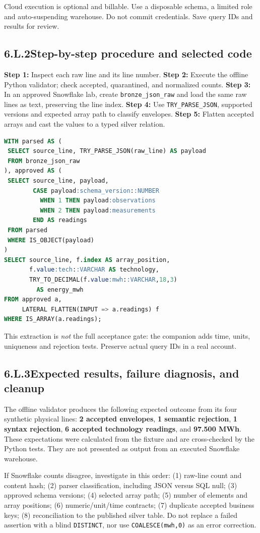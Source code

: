 \documentclass[11pt,twoside]{article}
\newcommand{\topic}[2]{\subsection*{#1\quad #2}}
\begin{document}
Cloud execution is optional and billable. Use a disposable schema, a limited role and auto-suspending warehouse. Do not commit credentials. Save query IDs and results for review.

\topic{6.L.2}{Step-by-step procedure and selected code}
\textbf{Step 1:} Inspect each raw line and its line number. \textbf{Step 2:} Execute the offline Python validator; check accepted, quarantined, and normalized counts. \textbf{Step 3:} In an approved Snowflake lab, create \texttt{bronze\_json\_raw} and load the same raw lines as text, preserving the line index. \textbf{Step 4:} Use \texttt{TRY\_PARSE\_JSON}, supported versions and expected array path to classify envelopes. \textbf{Step 5:} Flatten accepted arrays and cast the values to a typed silver relation.

\begin{lstlisting}[language=SQL,caption={The core extraction; full script and guards in companion lab.}]
WITH parsed AS (
 SELECT source_line, TRY_PARSE_JSON(raw_line) AS payload
 FROM bronze_json_raw
), approved AS (
 SELECT source_line, payload,
        CASE payload:schema_version::NUMBER
          WHEN 1 THEN payload:observations
          WHEN 2 THEN payload:measurements
        END AS readings
 FROM parsed
 WHERE IS_OBJECT(payload)
)
SELECT source_line, f.index AS array_position,
       f.value:tech::VARCHAR AS technology,
       TRY_TO_DECIMAL(f.value:mwh::VARCHAR,18,3)
         AS energy_mwh
FROM approved a,
     LATERAL FLATTEN(INPUT => a.readings) f
WHERE IS_ARRAY(a.readings);
\end{lstlisting}
This extraction is \emph{not} the full acceptance gate: the companion adds time, units, uniqueness and rejection tests. Preserve actual query IDs in a real account.
\newpage
\topic{6.L.3}{Expected results, failure diagnosis, and cleanup}
The offline validator produces the following expected outcome from its four synthetic physical lines: \textbf{2 accepted envelopes}, \textbf{1 semantic rejection}, \textbf{1 syntax rejection}, \textbf{6 accepted technology readings}, and \textbf{97.500 MWh}. These expectations were calculated from the fixture and are cross-checked by the Python tests. They are not presented as output from an executed Snowflake warehouse.

If Snowflake counts disagree, investigate in this order: (1) raw-line count and content hash; (2) parser classification, including JSON versus SQL null; (3) approved schema versions; (4) selected array path; (5) number of elements and array positions; (6) numeric/unit/time contracts; (7) duplicate accepted business keys; (8) reconciliation to the published silver table. Do not replace a failed assertion with a blind \texttt{DISTINCT}, nor use \texttt{COALESCE(mwh,0)} as an error correction.
\end{document}
